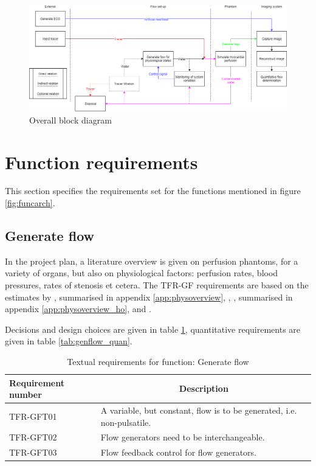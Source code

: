 \begin{figure}[H]
	\includegraphics[width=\linewidth]{./images/technical_blockdiagram.png}
	\caption{Overall block diagram}
	\label{fig:overall_block}
\end{figure}

\section{Function requirements}
This section specifies the requirements set for the functions mentioned in figure \ref{fig:funcarch}.
\subsection{Generate flow}
In the project plan, a literature overview is given on perfusion phantoms, for a variety of organs, but also on physiological factors: perfusion rates, blood pressures, rates of stenosis et cetera. The TFR-GF requirements are based on the estimates by \cite{uren1994relation}, summarised in appendix \ref{app:physoverview}, \cite{chiribiri2013normal}, \cite{ho2014dynamic}, summarised in appendix \ref{app:physoverview_ho}, and \cite{slart2015Pres}.

Decisions and design choices are given in table \ref{tab:genflow_text}, quantitative requirements are given in table \ref{tab:genflow_quan}.

\begin{table}[H]
\caption{Textual requirements for function: Generate flow}
\label{tab:genflow_text}
\begin{tabular}{p{25mm}|p{115mm}|}
	\textbf{Requirement number} & \multicolumn{1}{c}{\textbf{Description}} \\
	\hline
	TFR-GFT01 & A variable, but constant, flow is to be generated, i.e. non-pulsatile. \\
	TFR-GFT02 & Flow generators need to be interchangeable. \\
	TFR-GFT03 & Flow feedback control for flow generators. \\
	\cline{2-2}
\end{tabular}
\end{table}

